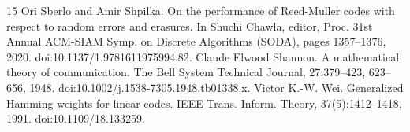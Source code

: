 \documentclass[10pt,a4paper]{article}
\begin{document}
\begin{thebibliography}{15}
 Ori Sberlo and Amir Shpilka. On the performance of Reed-Muller codes with respect to random errors and erasures. In Shuchi Chawla, editor, Proc. 31st Annual ACM-SIAM Symp. on Discrete Algorithms (SODA), pages 1357–1376, 2020. doi:10.1137/1.9781611975994.82.
 Claude Elwood Shannon. A mathematical theory of communication. The Bell System Technical Journal, 27:379–423, 623–656, 1948. doi:10.1002/j.1538-7305.1948.tb01338.x.
 Victor K.-W. Wei. Generalized Hamming weights for linear codes. IEEE Trans. Inform. Theory, 37(5):1412–1418, 1991. doi:10.1109/18.133259.
\end{thebibliography}
\end{document}
